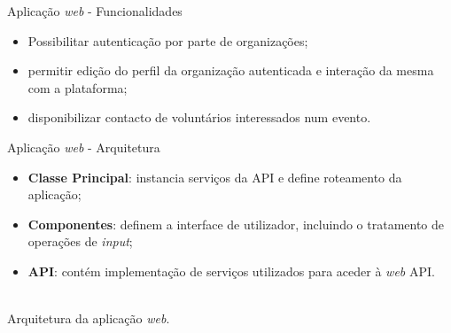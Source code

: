 \begin{frame}{Aplicação \textit{web} - Funcionalidades}

\vspace*{-3em}

\begin{itemize}
	\item Possibilitar autenticação por parte de organizações;
	\item permitir edição do perfil da organização autenticada e interação da mesma com a plataforma;
	\item disponibilizar contacto de voluntários interessados num evento.	
\end{itemize}

\end{frame}

\begin{frame}{Aplicação \textit{web} - Arquitetura}
	
\vspace*{-3em}
	
\begin{itemize}
	\item \textbf{Classe Principal}: instancia serviços da API e define roteamento da aplicação;
	\item \textbf{Componentes}: definem a interface de utilizador, incluindo o tratamento de operações de \textit{input};
	\item \textbf{API}: contém implementação de serviços utilizados para aceder à \textit{web} API.
\end{itemize}		

\centering
{}\\

{\small Arquitetura da aplicação \textit{web}.}

\end{frame}